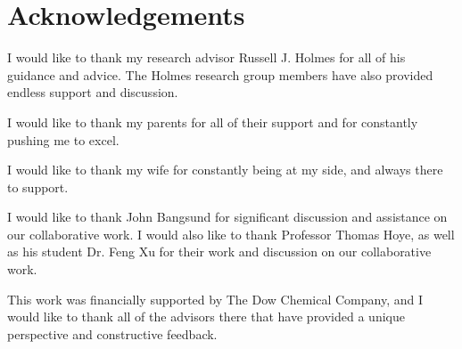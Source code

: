 \documentclass[../thesis.tex]{subfiles}
\begin{document}
\section*{Acknowledgements}

I would like to thank my research advisor Russell J. Holmes for all of his guidance and advice.
The Holmes research group members have also provided endless support and discussion.

I would like to thank my parents for all of their support and for constantly pushing me to excel.

I would like to thank my wife for constantly being at my side, and always there to support.

I would like to thank John Bangsund for significant discussion and assistance on our collaborative work.
I would also like to thank Professor Thomas Hoye, as well as his student Dr. Feng Xu for their work and discussion on our collaborative work.



This work was financially supported by The Dow Chemical Company, and I would like to thank all of the advisors there that have provided a unique perspective and constructive feedback.



\pagebreak
\end{document}
